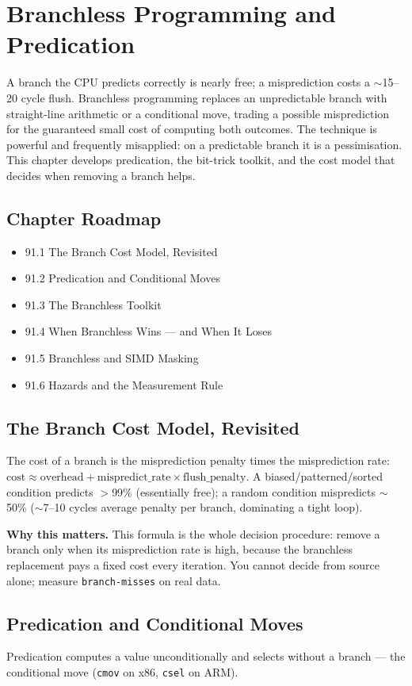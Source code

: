 \chapter{Branchless Programming and Predication}

A branch the CPU predicts correctly is nearly free; a misprediction costs a $\sim$15--20 cycle flush. Branchless programming replaces an unpredictable branch with straight-line arithmetic or a conditional move, trading a possible misprediction for the guaranteed small cost of computing both outcomes. The technique is powerful and frequently misapplied: on a predictable branch it is a pessimisation. This chapter develops predication, the bit-trick toolkit, and the cost model that decides when removing a branch helps.

\section*{Chapter Roadmap}
\begin{itemize}
\item 91.1 The Branch Cost Model, Revisited
\item 91.2 Predication and Conditional Moves
\item 91.3 The Branchless Toolkit
\item 91.4 When Branchless Wins --- and When It Loses
\item 91.5 Branchless and SIMD Masking
\item 91.6 Hazards and the Measurement Rule
\end{itemize}

\section{The Branch Cost Model, Revisited}
The cost of a branch is the misprediction penalty times the misprediction rate: \(\text{cost} \approx \text{overhead} + \text{mispredict\_rate} \times \text{flush\_penalty}\). A biased/patterned/sorted condition predicts $>$99\% (essentially free); a random condition mispredicts $\sim$50\% ($\sim$7--10 cycles average penalty per branch, dominating a tight loop).

\textbf{Why this matters.} This formula is the whole decision procedure: remove a branch only when its misprediction rate is high, because the branchless replacement pays a fixed cost every iteration. You cannot decide from source alone; measure \texttt{branch-misses} on real data.

\section{Predication and Conditional Moves}
Predication computes a value unconditionally and selects without a branch --- the conditional move (\texttt{cmov} on x86, \texttt{csel} on ARM).

